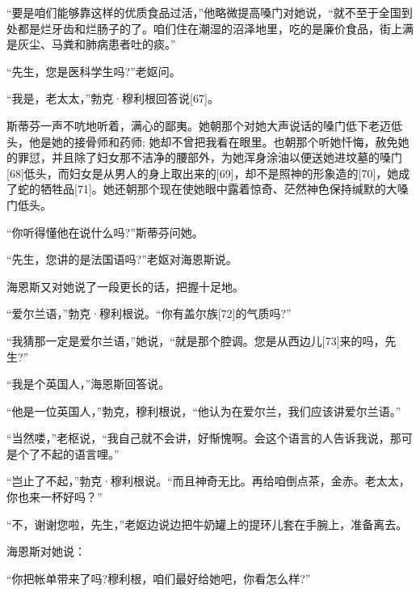 \documentclass{article}
\begin{document}
“要是咱们能够靠这样的优质食品过活，”他略微提高嗓门对她说，“就不至于全国到处都是烂牙齿和烂肠子的了。咱们住在潮湿的沼泽地里，吃的是廉价食品，街上满是灰尘、马粪和肺病患者吐的痰。”



“先生，您是医科学生吗?”老妪问。



“我是，老太太，”勃克·穆利根回答说[67]。



斯蒂芬一声不吭地听着，满心的鄙夷。她朝那个对她大声说话的嗓门低下老迈低头，他是她的接骨师和药师; 她却不曾把我看在眼里。也朝那个听她忏悔，赦免她的罪愆，并且除了妇女那不洁净的腰部外，为她浑身涂油以便送她进坟墓的嗓门[68]低头，而妇女是从男人的身上取出来的[69]，却不是照神的形象造的[70]，她成了蛇的牺牲品[71]。她还朝那个现在使她眼中露着惊奇、茫然神色保持缄默的大嗓门低头。



“你听得懂他在说什么吗?”斯蒂芬问她。



“先生，您讲的是法国语吗?”老妪对海恩斯说。



海恩斯又对她说了一段更长的话，把握十足地。



“爱尔兰语，”勃克·穆利根说。“你有盖尔族[72]的气质吗?”



“我猜那一定是爱尔兰语，”她说，“就是那个腔调。您是从西边儿[73]来的吗，先生?”



“我是个英国人，”海恩斯回答说。



“他是一位英国人，”勃克，穆利根说，“他认为在爱尔兰，我们应该讲爱尔兰语。”



“当然喽，”老枢说，“我自己就不会讲，好惭愧啊。会这个语言的人告诉我说，那可是个了不起的语言哩。”



“岂止了不起，”勃克·穆利根说。“而且神奇无比。再给咱倒点茶，金赤。老太太，你也来一杯好吗？”



“不，谢谢您啦，先生，”老妪边说边把牛奶罐上的提环儿套在手腕上，准备离去。



海恩斯对她说：



“你把帐单带来了吗?穆利根，咱们最好给她吧，你看怎么样?”
\end{document}
